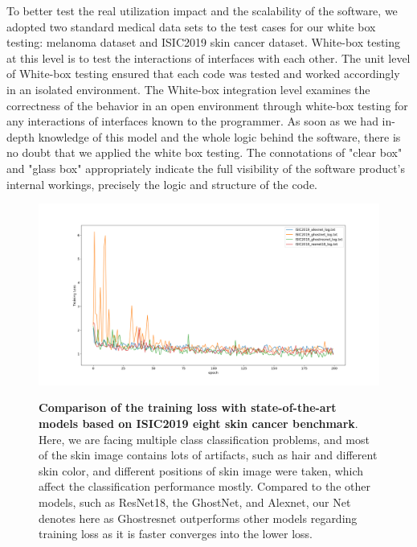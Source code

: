 To better test the real utilization impact and the scalability of the software, we adopted two standard medical data sets to the test cases for our white box testing: melanoma dataset\cite{melanoma} and ISIC2019 skin cancer dataset\cite{ISIC1}\cite{ISIC2}. White-box testing at this level is to test the interactions of interfaces with each other. The unit level of White-box testing ensured that each code was tested and worked accordingly in an isolated environment. The White-box integration level examines the correctness of the behavior in an open environment through white-box testing for any interactions of interfaces known to the programmer. As soon as we had in-depth knowledge of this model and the whole logic behind the software, there is no doubt that we applied the white box testing.
The connotations of "clear box" and "glass box" appropriately indicate the full visibility of the software product's internal workings, precisely the logic and structure of the code. 






\begin{figure}[t]
\includegraphics[height=0.4\textheight,width=1\textwidth]{thesis-template-master/images/loss_train.png}
\label{fig:cellnet}
\caption{ \textbf{Comparison of the training loss with state-of-the-art models based on ISIC2019 eight skin cancer benchmark\cite{ISIC1}\cite{ISIC2}}. Here, we are facing multiple class classification problems, and most of the skin image contains lots of artifacts, such as hair and different skin color, and different positions of skin image were taken, which affect the classification performance mostly. Compared to the other models, such as ResNet18\cite{20}, the GhostNet\cite{19}, and Alexnet\cite{33}, our Net denotes here as Ghostresnet outperforms other models regarding training loss as it is faster converges into the lower loss. }
\label{fig:6.8}
\end{figure}

